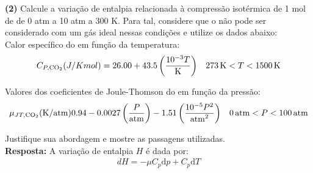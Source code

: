 \textbf{(2)} Calcule a variação de entalpia relacionada à compressão isotérmica
de 1 mol de  de 0 atm a 10 atm a 300 K. Para tal, considere que o
 não pode ser considerado com um gás ideal nessas condições e utilize os
dados abaixo:\\

Calor específico do  em função da temperatura:
\begin{align*}
    C_{P, \ce{CO2}} (J / K mol) = \num{26.00} + \num{43.5} \left(\frac{10^{-3}
    T}{\unit{K}}\right) && \qty{273}{K} < T < \qty{1500}{K}
\end{align*}

Valores dos coeficientes de Joule-Thomson do  em função da pressão:
\begin{align*}
    \mu_{JT, \ce{CO2}} (\unit{K} / \unit{atm}) \num{0.94} - \num{0.0027} \left(
    \frac{P}{\unit{atm}} \right) - \num{1.51} \left( \frac{10^{-5}
    P^2}{\unit{atm}^2} \right) && \qty{0}{atm} < P < \qty{100}{atm}
\end{align*}

Justifique sua abordagem e mostre as passagens utilizadas.\\

\textbf{Resposta:} A variação de entalpia \( H \) é dada por:
\begin{align*}
    dH = -\mu C_p \text{d}p + C_p \text{d}T
\end{align*}
